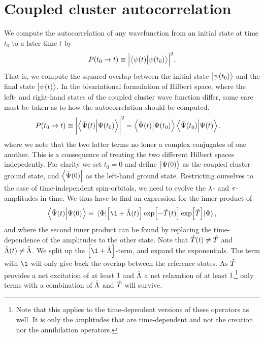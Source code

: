 \chapter{Coupled cluster autocorrelation}
    \label{app:cc-autocorrelation}
    We compute the autocorrelation of any wavefunction from an initial state at
    time $t_0$ to a later time $t$ by
    \begin{align}
        P(t_0 \to t)
        \equiv \abs{\braket{\psi(t)}{\psi(t_0)}}^2.
    \end{align}
    That is, we compute the squared overlap between the initial state
    $\ket{\psi(t_0)}$ and the final state $\ket{\psi(t)}$.
    In the bivariational formulation of Hilbert space, where the left- and
    right-hand states of the coupled cluster wave function differ, some care
    must be taken as to how the autocorrelation should be computed.
    \begin{align}
        P(t_0 \to t)
        &\equiv \abs{\braket{\tilde{\Psi}(t)}{\Psi(t_0)}}^2
        = \braket{\tilde{\Psi}(t)}{\Psi(t_0)}
        \braket{\tilde{\Psi}(t_0)}{\Psi(t)},
    \end{align}
    where we note that the two latter terms no loner a complex conjugates of one
    another.
    This is a consequence of treating the two different Hilbert spaces
    indepedently.
    For clarity we set $t_0 = 0$ and define $\ket{\Psi(0)}$ as the coupled
    cluster ground state, and $\bra{\tilde{\Psi}(0)}$ as the left-hand ground
    state.
    Restricting ourselves to the case of time-independent spin-orbitals, we need
    to evolve the $\lambda$- and $\tau$-amplitudes in time.
    We thus have to find an expression for the inner product of
    \begin{gather}
        \braket{\tilde{\Psi}(t)}{\Psi(0)}
        =
        \mel{\slat}{
            \brak{\1 + \clustl(t)}
            \exp[-\clust(t)]
            \exp[\clust]
        }{\slat},
    \end{gather}
    and where the second inner product can be found by replacing the
    time-dependence of the amplitudes to the other state.
    Note that $\hat{T}(t) \neq \hat{T}$ and $\hat{\Lambda}(t) \neq \hat{\Lambda}$.
    We split up the $\brak{\1 + \clustl}$-term, and expand the exponentials.
    The term with $\1$ will only give back the overlap between the reference
    states.
    As $\hat{T}$ provides a net excitation of at least $1$ and $\hat{\Lambda}$ a net
    relaxation of at least $1$,\footnote{
        Note that this applies to the time-dependent versions
        of these operators as well. It is only the amplitudes that are
        time-dependent and not the creation nor the annihilation operators.
    } only terms with a combination of $\hat{\Lambda}$ and $\hat{T}$ will survive.
